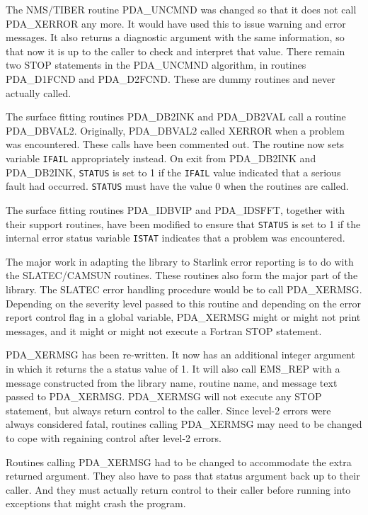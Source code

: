 \documentclass[11pt,twoside]{article}
\newcommand{\htmlref}[2]{#1}
\newcommand{\xref}[3]{#1}
\begin{document}
   The NMS/TIBER routine PDA\_UNCMND was changed so that it does not
   call PDA\_XERROR any more. It would have used this to issue warning
   and error messages. It also returns a diagnostic argument with the
   same information, so that now it is up to the caller to check and
   interpret that value. There remain two STOP statements in the
   PDA\_UNCMND algorithm, in routines PDA\_D1FCND and PDA\_D2FCND. These
   are dummy routines and never actually called.

The surface fitting routines PDA\_DB2INK and PDA\_DB2VAL call a 
routine PDA\_DBVAL2. Originally, PDA\_DBVAL2 called XERROR when a 
problem was encountered. These calls have been commented out. The 
routine now sets variable {\tt IFAIL} appropriately instead. On exit from 
PDA\_DB2INK and PDA\_DB2INK, {\tt STATUS} is set to 1 if the 
{\tt IFAIL} value indicated that a serious fault had occurred. 
{\tt STATUS} must have the 
value 0 when the routines are called.
  
The surface fitting routines PDA\_IDBVIP and PDA\_IDSFFT, together
with their support routines, have been modified to ensure that {\tt STATUS}
is set to 1 if the internal error status variable {\tt ISTAT} indicates
that a problem was encountered.

   The major work in adapting the library to Starlink error reporting is
   to do with the SLATEC/\-CAMSUN routines. These routines also form the
   major part of the library. The SLATEC error handling procedure would
   be to call
\htmlref{PDA\_XERMSG.}{PDA\_XERMSG}
   Depending on the severity level passed to this routine and depending
   on the error report control flag in a global variable, PDA\_XERMSG might
   or might not print messages, and it might or might not execute a
   Fortran STOP statement.

   PDA\_XERMSG has been re-written. It now has an additional integer argument
   in which it returns the a status value of 1. It will
   also call
\xref{EMS\_REP}{ssn4}{EMS\_REP}
   with a message constructed from the library name, routine name, and
   message text passed to PDA\_XERMSG. PDA\_XERMSG will not execute any STOP
   statement, but always return control to the caller. Since level-2
   errors were always considered fatal, routines calling PDA\_XERMSG may need
   to be changed to cope with regaining control after level-2 errors.

   Routines calling PDA\_XERMSG had to be changed to accommodate the extra
   returned argument. They also have to pass that status argument back
   up to their caller. And they must actually return control to their
   caller before running into exceptions that might crash the program.
\end{document}
